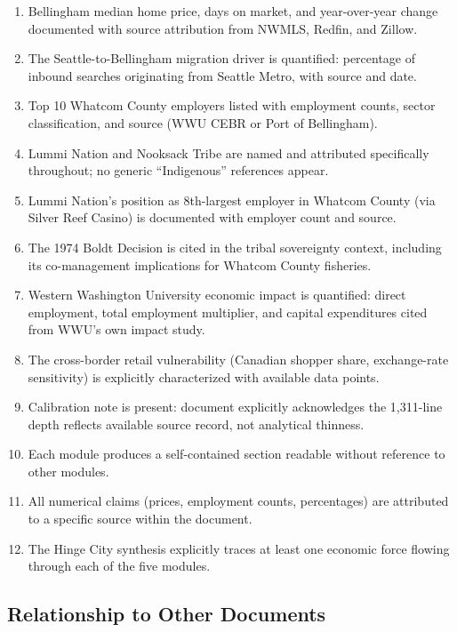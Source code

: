 \documentclass[11pt,letterpaper]{article}
\begin{document}
\begin{enumerate}[leftmargin=*, label=\textbf{SC-\arabic*:}]
  \item Bellingham median home price, days on market, and year-over-year change documented with source attribution from NWMLS, Redfin, and Zillow.
  \item The Seattle-to-Bellingham migration driver is quantified: percentage of inbound searches originating from Seattle Metro, with source and date.
  \item Top 10 Whatcom County employers listed with employment counts, sector classification, and source (WWU CEBR or Port of Bellingham).
  \item Lummi Nation and Nooksack Tribe are named and attributed specifically throughout; no generic ``Indigenous'' references appear.
  \item Lummi Nation's position as 8th-largest employer in Whatcom County (via Silver Reef Casino) is documented with employer count and source.
  \item The 1974 Boldt Decision is cited in the tribal sovereignty context, including its co-management implications for Whatcom County fisheries.
  \item Western Washington University economic impact is quantified: direct employment, total employment multiplier, and capital expenditures cited from WWU's own impact study.
  \item The cross-border retail vulnerability (Canadian shopper share, exchange-rate sensitivity) is explicitly characterized with available data points.
  \item Calibration note is present: document explicitly acknowledges the 1,311-line depth reflects available source record, not analytical thinness.
  \item Each module produces a self-contained section readable without reference to other modules.
  \item All numerical claims (prices, employment counts, percentages) are attributed to a specific source within the document.
  \item The Hinge City synthesis explicitly traces at least one economic force flowing through each of the five modules.
\end{enumerate}

\subsection{Relationship to Other Documents}
\end{document}
